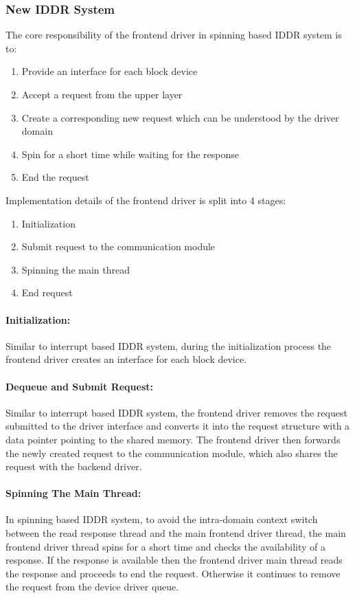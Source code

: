 \subsubsection*{New IDDR System}
The core responsibility of the frontend driver in spinning based IDDR system is to:
\begin{enumerate}
\item Provide an interface for each block device
\item Accept a request from the upper layer
\item Create a corresponding new request which can be understood by the driver domain
\item Spin for a short time while waiting for the response
\item End the request
\end{enumerate}

Implementation details of the frontend driver is split into 4 stages:
\begin{enumerate}
\item Initialization
\item Submit request to the communication module
\item Spinning the main thread
\item End request
\end{enumerate}

\paragraph{Initialization:}
Similar to interrupt based IDDR system, during the initialization process the frontend driver creates an interface for each block device.

\paragraph{Dequeue and Submit Request:}
Similar to interrupt based IDDR system, the frontend driver removes the request submitted to the driver interface and converts it into the request structure with a data pointer pointing to the shared memory. The frontend driver then forwards the newly created request to the communication module, which also shares the request with the backend driver.

\paragraph{Spinning The Main Thread:}
In spinning based IDDR system, to avoid the intra-domain context switch between the read response thread and the main frontend driver thread, the main frontend driver thread spins for a short time and checks the availability of a response. If the response is available then the frontend driver main thread reads the response and proceeds to end the request. Otherwise it continues to remove the request from the device driver queue.

